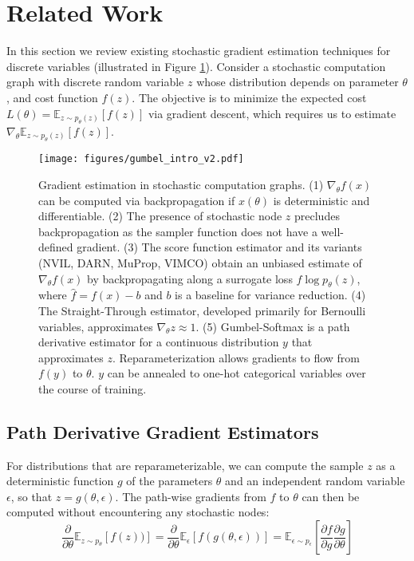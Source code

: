 \documentclass{article} %
\begin{document}
\section{Related Work} \label{background}

In this section we review existing stochastic gradient estimation techniques for discrete variables (illustrated in Figure \ref{fig:stochastic_backprop}). Consider a stochastic computation graph \citep{2015arXiv150605254S} with discrete random variable $z$ whose distribution depends on parameter $\theta$, and cost function $f(z)$. The objective is to minimize the expected cost $L(\theta) = \mathbb{E}_{z \sim p_\theta(z)}[f(z)]$ via gradient descent, which requires us to estimate $\nabla_\theta \mathbb{E}_{z \sim p_\theta(z)}[f(z)]$.

\begin{figure}[h]  
  \centering
\texttt{[image: figures/gumbel\_intro\_v2.pdf]}
  \caption{Gradient estimation in stochastic computation graphs. (1) $\nabla_\theta{f(x)}$ can be computed via backpropagation if $x(\theta)$ is deterministic and differentiable. (2) The presence of stochastic node $z$ precludes backpropagation as the sampler function does not have a well-defined gradient. (3) The score function estimator and its variants (NVIL, DARN, MuProp, VIMCO) obtain an unbiased estimate of $\nabla_\theta{f(x)}$ by backpropagating along a surrogate loss $\hat{f}\log p_\theta(z)$, where $\hat{f} = f(x) - b$ and $b$ is a baseline for variance reduction. (4) The Straight-Through estimator, developed primarily for Bernoulli variables, approximates $\nabla_\theta z \approx 1$. (5) Gumbel-Softmax is a path derivative estimator for a continuous distribution $y$ that approximates $z$. Reparameterization allows gradients to flow from $f(y)$ to $\theta$. $y$ can be annealed to one-hot categorical variables over the course of training.}
 \label{fig:stochastic_backprop}
\end{figure}

\subsection{Path Derivative Gradient Estimators}
\label{path_deriv}
For distributions that are reparameterizable, we can compute the sample $z$ as a deterministic function $g$ of the parameters $\theta$ and an independent random variable $\epsilon$, so that $z = g(\theta, \epsilon)$. The path-wise gradients from $f$ to $\theta$ can then be computed without encountering any stochastic nodes:
\begin{equation}
\frac{\partial}{\partial \theta} \mathbb{E}_{z\sim p_\theta}\left[f(z))\right] = \frac{\partial}{\partial \theta} \mathbb{E}_{\epsilon}\left[f(g(\theta,\epsilon))\right] = \mathbb{E}_{\epsilon\sim p_\epsilon}\left[\frac{\partial f}{\partial g} \frac{\partial g}{\partial \theta}\right]
\end{equation}
\end{document}
